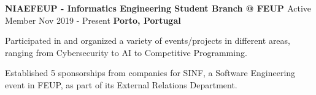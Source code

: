 \begin{cventries}
  \cventry
     {\textbf{NIAEFEUP - Informatics Engineering Student Branch @ FEUP \href{https://ni.fe.up.pt/}{\faExternalLink}}} %
    {Active Member} %
    {Nov 2019 - Present} %
    {\textbf{Porto, Portugal}} %
    {
      \begin{cvitems} %
        \item {Participated in and organized a variety of events/projects in different areas, ranging from Cybersecurity to AI to Competitive Programming.}
        \item {Established 5 sponsorships from companies for SINF, a Software Engineering event in FEUP, as part of its External Relations Department.}
      \end{cvitems}
    }

\end{cventries}
